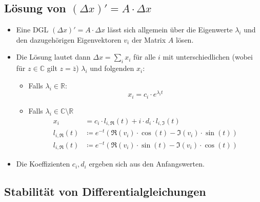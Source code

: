         \subsection{Lösung von \( (\Delta x)' = A \cdot \Delta x \)} %
            \begin{itemize}
            	\item Eine DGL \( (\Delta x)' = A \cdot \Delta x \) lässt sich allgemein über die Eigenwerte \( \lambda _ i \) und den dazugehörigen Eigenvektoren \( v _ i \) der Matrix \(A\) lösen.
            	\item Die Lösung lautet dann \( \Delta x = \sum _ i x _ i \) für alle \( i \) mit unterschiedlichen (wobei für \( z \in \mathbb{C} \) gilt \( z = \bar{z} \)) \( \lambda _ i \) und folgenden \( x _ i \):
	            	\begin{itemize}
		            	\item Falls \( \lambda _ i \in \mathbb{R} \):
			            	\begin{equation*}
				            	x _ i = c _ i \cdot e ^ { \lambda _ i t }
			            	\end{equation*}
			            \item Falls \( \lambda _ i \in \mathbb{C} \setminus \mathbb{R} \)
				            \begin{align*}
					            x _ i &= c _ i \cdot l _ { i, \Re } (t) + i \cdot d _ i \cdot l _ { i, \Im } (t) \\
					            l _ { i, \Re } (t) &\coloneqq e ^ {-t} (\Re(v _ i) \cdot \cos(t) - \Im(v _ i) \cdot \sin(t)) \\
					            l _ { i, \Re } (t) &\coloneqq e ^ {-t} (\Re(v _ i) \cdot \sin(t) - \Im(v _ i) \cdot \cos(t))
				            \end{align*}
	            	\end{itemize}
	            \item Die Koeffizienten \( c _ i, d _ i \) ergeben sich aus den Anfangswerten.
            \end{itemize}

        \subsection{Stabilität von Differentialgleichungen} %
            \label{sec:stabilitydgl}
        
